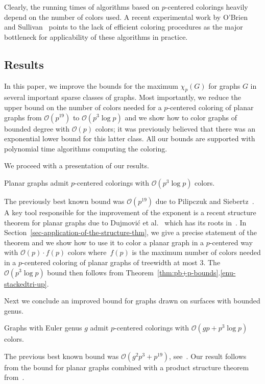 Clearly, the running times of algorithms based on $p$-centered colorings 
heavily depend on the number of colors used.
A recent experimental work by O’Brien and Sullivan~\cite{BS17}
points to the lack of efficient coloring procedures
as the major bottleneck for applicability of these algorithms in practice.

\subsection{Results} In this paper, we improve the bounds for the maximum
$\chi_p(G)$ for graphs $G$ in several important sparse classes of graphs.
Most importantly, we reduce the upper bound on the number of colors needed for
a $p$-centered coloring of planar graphs from $\mathcal{O}(p^{19})$ to
$\mathcal{O}(p^3\log p)$ and we show how to color graphs of bounded degree with
$\mathcal{O}(p)$ colors; it was previously believed that there was an exponential
lower bound for this latter class.  All our bounds are supported with
polynomial time algorithms computing the coloring.

We proceed with a presentation of our results.

\begin{theorem}
Planar graphs admit $p$-centered colorings with $\mathcal{O}(p^3\log p)$ colors. 
\label{thm:planarup}
\end{theorem}
The previously best known bound was $\mathcal{O}(p^{19})$ due to
Pilipczuk and Siebertz~\cite{PS19}.
A key tool responsible for the improvement of the exponent is 
a recent structure theorem for planar graphs due to 
Dujmović et al.~\cite{DJMMUW-queues} which has its roots in~\cite{PS19}.
In Section~\ref{sec-application-of-the-structure-thm}, 
we give a precise statement of the theorem and we show how to use it to
color a planar graph in a $p$-centered way with $\mathcal{O}(p)\cdot f(p)$ colors 
where~$f(p)$ is the maximum number of colors needed in a $p$-centered coloring
of planar graphs of treewidth at most $3$.
The $\mathcal{O}(p^3\log p)$ bound then follows from
Theorem~\ref{thm:pb+p-bounds}.\ref{enu-stackedtri-up}.
  

Next we conclude an improved bound for graphs drawn on surfaces with bounded genus.
\begin{theorem}\label{thm:genusup}
  Graphs with Euler genus $g$ admit $p$-centered
  colorings with $\mathcal{O}(gp+p^3\log p)$ colors.
\end{theorem}
The previous best known bound was $\mathcal{O}(g^2p^3+p^{19})$, see~\cite{PS19}.
Our result follows from the bound for planar graphs combined with 
a product structure theorem from~\cite{DJMMUW-queues}.

